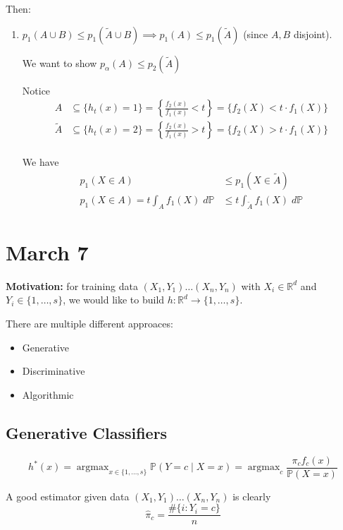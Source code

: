 \documentclass[12pt]{report}
\renewcommand{\hat}[1]{\widehat{#1}}
\renewcommand{\P}{\mathbb{P}}
\newcommand{\R}{\mathbb{R}}
\newcommand{\sub}{\subseteq}
\newcommand*{\tbf}[1]{\ifmmode\mathbf{#1}\else\textbf{#1}\fi}
\DeclareMathOperator*{\argmax}{\arg\max}
\newenvironment*{tbox}[2][gray]{
    \begin{tcolorbox}[
        parbox=false,
        colback=#1!5!white,
        colframe=#1!75!black,
        breakable,
        title={#2}
    ]}
    {\end{tcolorbox}}
\begin{document}
\begin{tbox}{\textbf{Theorem:} Fix $t \in (0, \infty)$. Let $h$ be any other classifier. If $\text{FAR}_h \leq \text{FAR}_{h_t}$, then $\text{DR}_h \leq \text{DR}_{h_t}$}
	Then:
	\begin{enumerate}
		\item $p_1(A \cup B) \leq p_1(\tilde A \cup B) \implies p_1(A) \leq p_1(\tilde A)$ (since $A, B$ disjoint).

		      We want to show $p_{\alpha}(A) \leq p_2(\tilde A)$

		      Notice
		      \begin{align*}
			      A        & \sub \{h_t(x) = 1\} = \left\{\frac{f_2(x)}{f_1(x)} < t\right\} = \{f_2(X) < t \cdot f_1(X)\} \\
			      \tilde A & \sub \{h_t(x) = 2\} = \left\{\frac{f_2(x)}{f_1(x)} > t\right\} = \{f_2(X) > t \cdot f_1(X)\} \\
		      \end{align*}

		      We have
		      \begin{align*}
			      p_1(X \in A)                         & \leq p_1(X\in \tilde A)             \\
			      p_1(X \in A) = t \int_A f_1(X)\; d\P & \leq t \int_{\tilde A} f_1(X)\; d\P
		      \end{align*}
	\end{enumerate}
\end{tbox}

\section{March 7}

\tbf{Motivation:} for training data $(X_1, Y_1) \dots (X_n, Y_n)$ with $X_i \in \R^d$ and $Y_i \in \{1, \dots, s\}$, we would like to build $h: \R^d \to \{1, \dots, s\}$.

There are multiple different approaces:
\begin{itemize}
	\item Generative
	\item Discriminative
	\item Algorithmic
\end{itemize}

\subsection{Generative Classifiers}
\[h^*(x) = \argmax_{x \in \{1, \dots, s\}} \P(Y = c \; | \; X = x) = \argmax_c \frac{\pi_c f_c(x)}{\P(X = x)}\]

A good estimator given data $(X_1, Y_1) \dots (X_n, Y_n)$ is clearly
\[\hat \pi_c = \frac{\#\{i: Y_i = c\}}{n}\]
\end{document}
